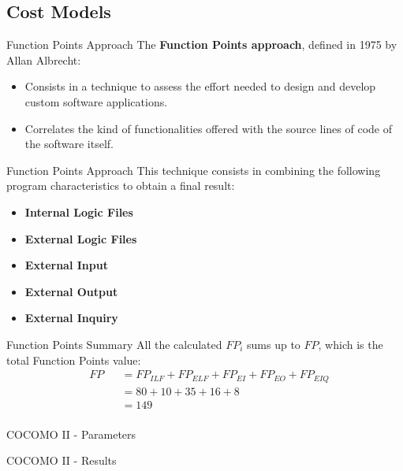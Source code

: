 \documentclass{../Common/Structure/pdf_presentation}
\begin{document}
	\subsection{Cost Models}
	\begin{frame}{Function Points Approach}
		The \textbf{Function Points approach}, defined in 1975 by Allan Albrecht:
		\begin{itemize}
			\item Consists in a technique to assess the effort needed to design and develop custom software applications.
			\item Correlates the kind of functionalities offered with the source lines of code of the software itself.
		\end{itemize}
	\end{frame}
	\begin{frame}{Function Points Approach}
		This technique consists in combining the following program characteristics to obtain a final result:
		\begin{itemize}
			\item \textbf{Internal Logic Files}%
			\item \textbf{External Logic Files} %
			\item \textbf{External Input} %
			\item \textbf{External Output} %
			\item \textbf{External Inquiry} %
		\end{itemize}
	\end{frame}
	\begin{frame}{Function Points Summary}
		All the calculated $FP_{i}$ sums up to $FP$, which is the total Function Points value:
		\begin{equation*}
			\begin{aligned}
				&	FP
				& & = FP_{ILF} + FP_{ELF} + FP_{EI} + FP_{EO} + FP_{EIQ}\\
				&&& = 80 + 10 + 35 + 16 + 8\\
				&&& = 149\\
			\end{aligned}
		\end{equation*}
	\end{frame}
	\begin{frame}{COCOMO II - Parameters}
	\end{frame}
	\begin{frame}{COCOMO II - Results}
	\end{frame}
\end{document}
